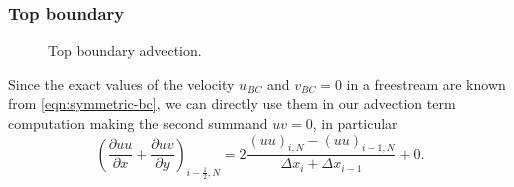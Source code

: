 \documentclass{article}
\numberwithin{equation}{section}
\begin{document}
\subsubsection{Top boundary}\label{subsubsec:laplacian-top}
\begin{figure}[H] %
  \caption{Top boundary advection.}\label{fig:ADV-top}
\end{figure}
Since the exact values of the velocity $u_{BC}$ and $v_{BC}=0$ in a freestream are known from \cref{eqn:symmetric-bc}, we can directly use them in our advection term computation making the second summand $uv=0$, in particular
\begin{equation}
	\left( \frac{\partial uu}{\partial x}+\frac{\partial uv}{\partial y}\right)_{i-\frac{1}{2},N}=2\frac{\left( uu\right)_{i,N}-\left( uu\right)_{i-1,N}}{\Delta x_i + \Delta x_{i-1}}+0.
\end{equation}
\end{document}
